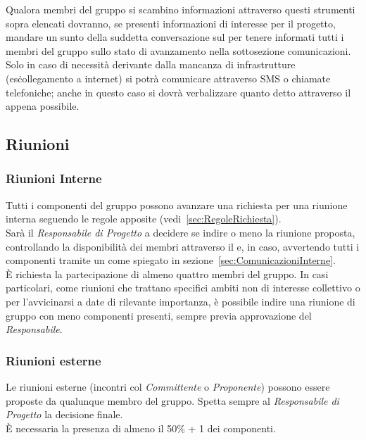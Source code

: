 \documentclass{scalatekids-article}
\begin{document}
Qualora membri del gruppo si scambino informazioni attraverso questi strumenti
sopra elencati dovranno, se presenti informazioni di interesse per il progetto,
mandare un sunto della suddetta conversazione sul  per tenere
informati tutti i membri del gruppo sullo stato di avanzamento nella
sottosezione comunicazioni.\\ Solo in caso di necessità derivante dalla mancanza
di infrastrutture (es\. collegamento a internet) si potrà comunicare attraverso
SMS o chiamate telefoniche; anche in questo caso si dovrà verbalizzare quanto
detto attraverso il  appena possibile.

\subsection{Riunioni}

\subsubsection{Riunioni Interne}

Tutti i componenti del gruppo possono avanzare una richiesta per una riunione
interna seguendo le regole apposite (vedi~\ref{sec:RegoleRichiesta}).\\
Sarà il \textit{Responsabile di Progetto} a decidere se indire
o meno la riunione proposta, controllando la disponibilità dei membri attraverso il
 e, in caso, avvertendo tutti i componenti tramite un  come
spiegato in sezione~\ref{sec:ComunicazioniInterne}.\\ È richiesta la partecipazione di
almeno quattro membri del gruppo. In casi particolari, come riunioni che
trattano specifici ambiti non di interesse collettivo o per l'avvicinarsi
a date di rilevante importanza, è possibile indire una riunione di gruppo con meno componenti
presenti, sempre previa approvazione del \textit{Responsabile}.

\subsubsection{Riunioni esterne}

Le riunioni esterne (incontri col \textit{Committente} o \textit{Proponente}) possono essere
proposte da qualunque membro del gruppo. Spetta sempre al \textit{Responsabile
  di Progetto} la decisione finale.\\ È necessaria la presenza di almeno il
50\% + 1 dei componenti.
\end{document}
